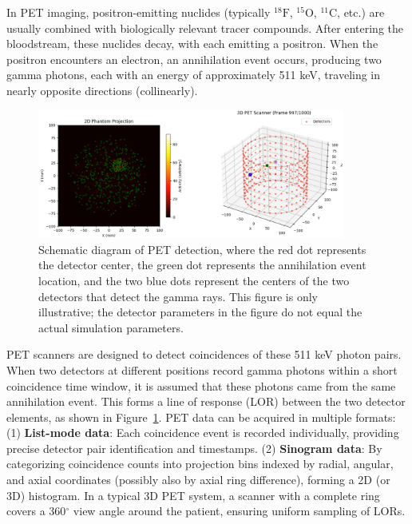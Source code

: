 \documentclass[
reprint,
superscriptaddress,
nofootinbib,
amsmath,amssymb,
aps,
prd,
]{revtex4-2}
\begin{document}
In PET imaging, positron-emitting nuclides (typically $^{18}\text{F}$, $^{15}\text{O}$, $^{11}\text{C}$, etc.) are usually combined with biologically relevant tracer compounds. After entering the bloodstream, these nuclides decay, with each emitting a positron. When the positron encounters an electron, an annihilation event occurs, producing two gamma photons, each with an energy of approximately 511 keV, traveling in nearly opposite directions (collinearly).

\begin{figure}[htbp]
    \centering
    \vspace{-0.2cm}
    \includegraphics[width=0.9\textwidth]{Images/Screenshot2025-02-07214940}
    \vspace{-0.2cm}
    \caption{Schematic diagram of PET detection, where the red dot represents the detector center, the green dot represents the annihilation event location, and the two blue dots represent the centers of the two detectors that detect the gamma rays. This figure is only illustrative; the detector parameters in the figure do not equal the actual simulation parameters.}
    \vspace{-0.2cm}
    \label{fig:pet_event}
\end{figure}

PET scanners are designed to detect coincidences of these 511 keV photon pairs. When two detectors at different positions record gamma photons within a short coincidence time window, it is assumed that these photons came from the same annihilation event. This forms a line of response (LOR) between the two detector elements, as shown in Figure~\ref{fig:pet_event}.
PET data can be acquired in multiple formats:
(1) \textbf{List-mode data}: Each coincidence event is recorded individually, providing precise detector pair identification and timestamps.
(2) \textbf{Sinogram data}: By categorizing coincidence counts into projection bins indexed by radial, angular, and axial coordinates (possibly also by axial ring difference), forming a 2D (or 3D) histogram.
In a typical 3D PET system, a scanner with a complete ring covers a 360$^\circ$ view angle around the patient, ensuring uniform sampling of LORs.
\end{document}
